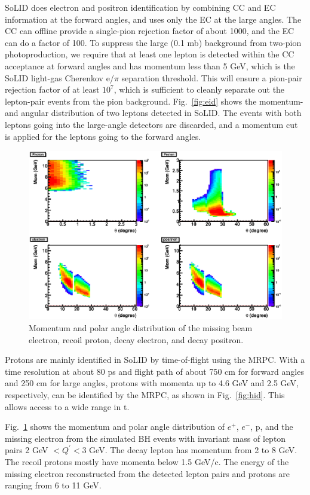 SoLID does electron and positron identification by combining CC and EC
information at the forward angles, and uses only the EC at the large angles.
The CC can offline provide a single-pion rejection factor of about 1000, and
the EC can do a factor of 100. To suppress the large (0.1 mb) background from
two-pion photoproduction, we require that at least one lepton is detected
within the CC acceptance at forward angles and has momentum less than 5 GeV,
which is the SoLID light-gas Cherenkov e/$\pi$ separation threshold. This will
ensure a pion-pair rejection factor of at least $10^7$, which is sufficient to
cleanly separate out the lepton-pair events from the pion background.
Fig.~\ref{fig:eid} shows the momentum- and angular distribution of two leptons
detected in SoLID. The events with both leptons going into the large-angle
detectors are discarded, and a momentum cut is applied for the leptons going
to the forward angles.

\begin{figure}[ht]
\includegraphics[width=125mm]{theta_mom_final.eps}
\caption{\small{Momentum and polar angle distribution of the missing
beam electron, recoil proton, decay electron, and decay positron.}}
\label{fig:theta_mom}
\end{figure}

Protons are mainly identified in SoLID by time-of-flight using the MRPC. With
a time resolution at about 80 ps and flight path of about 750 cm for forward
angles and 250 cm for large angles, protons with momenta up to 4.6 GeV and 2.5
GeV, respectively, can be identified by the MRPC, as shown in
Fig.~\ref{fig:hid}. This allows access to a wide range in t.

Fig.~\ref{fig:theta_mom} shows the momentum and polar angle distribution
of $e^+$, $e^-$, p, and the missing electron from the simulated BH events
with invariant mass of lepton pairs 2 GeV $< Q^\prime < 3$ GeV. The decay
lepton has momentum from 2 to 8 GeV. The recoil protons mostly have momenta
below 1.5 GeV/c. The energy of the missing electron reconstructed from the
detected lepton pairs and protons are ranging from 6 to 11 GeV.

